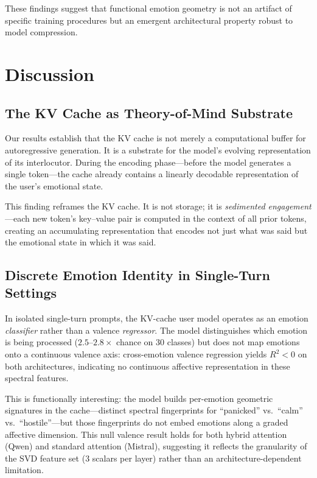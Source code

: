 \documentclass[11pt,a4paper]{article}
\begin{document}
These findings suggest that functional emotion geometry is not an artifact of specific training procedures but an emergent architectural property robust to model compression.

\section{Discussion}

\subsection{The KV Cache as Theory-of-Mind Substrate}

Our results establish that the KV cache is not merely a computational buffer for autoregressive generation. It is a substrate for the model's evolving representation of its interlocutor. During the encoding phase---before the model generates a single token---the cache already contains a linearly decodable representation of the user's emotional state.

This finding reframes the KV cache. It is not storage; it is \emph{sedimented engagement}---each new token's key--value pair is computed in the context of all prior tokens, creating an accumulating representation that encodes not just what was said but the emotional state in which it was said.

\subsection{Discrete Emotion Identity in Single-Turn Settings}

In isolated single-turn prompts, the KV-cache user model operates as an emotion \emph{classifier} rather than a valence \emph{regressor}. The model distinguishes which emotion is being processed ($2.5$--$2.8\times$ chance on 30 classes) but does not map emotions onto a continuous valence axis: cross-emotion valence regression yields $R^2 < 0$ on both architectures, indicating no continuous affective representation in these spectral features.

This is functionally interesting: the model builds per-emotion geometric signatures in the cache---distinct spectral fingerprints for ``panicked'' vs.\ ``calm'' vs.\ ``hostile''---but those fingerprints do not embed emotions along a graded affective dimension. This null valence result holds for both hybrid attention (Qwen) and standard attention (Mistral), suggesting it reflects the granularity of the SVD feature set (3 scalars per layer) rather than an architecture-dependent limitation.
\end{document}
